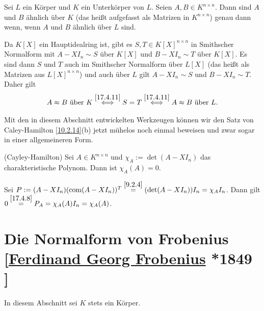 \documentclass[../../main.tex]{subfiles}
\begin{document}
\begin{pro}\label{17.4.14}
Sei $L$ ein Körper und $K$ ein Unterkörper von $L$. Seien $A,B\in K^{n\times n}$. Dann sind $A$ und $B$ ähnlich über $K$ (das heißt aufgefasst als Matrizen in $K^{n\times n}$) genau dann wenn, wenn $A$ und $B$ ähnlich über $L$ sind.
\end{pro}
\begin{cproof}
Da $K[X]$ ein Hauptidealring ist, gibt es $S,T\in K[X]^{n\times n}$ in Smithscher Normalform mit $A-XI_n\sim S$ über $K[X]$ und $B-XI_n\sim T$ über $K[X]$. Es sind dann $S$ und $T$ auch im Smithscher Normalform über $L[X]$ (das heißt als Matrizen aus $L[X]^{n\times n}$) und auch über $L$ gilt $A-XI_n\sim S$ und $B-XI_n\sim T$. Daher gilt
\begin{align*}
A\approx B\text{ über }K\stackrel{\ref{17.4.11}}{\Longleftrightarrow}S=T \stackrel{\ref{17.4.11}}{\Longleftrightarrow}A\approx B\text{ über }L.
\end{align*}
\end{cproof}

Mit den in diesem Abschnitt entwickelten Werkzeugen können wir den Satz von Caley-Hamilton \ref{10.2.14}(b) jetzt mühelos noch einmal beweisen und zwar sogar in einer allgemeineren Form.

\begin{sat}\label{17.4.15}
(Cayley-Hamilton) Sei $A\in K^{n\times n}$ und $\chi_A:=\det(A-XI_n)$ das charakteristische Polynom. Dann ist $\chi_A(A)=0$.
\end{sat}
\begin{cproof}
Sei $P:=(A-XI_n)(\operatorname{com}(A-XI_n))^T\stackrel{\ref{9.2.4}}{=}(\det(A-XI_n))I_n=\chi_AI_n$. Dann gilt $0\stackrel{\ref{17.4.8}}{=}P_A=\chi_A(A)I_n=\chi_A(A)$.
\end{cproof}

\section[Die Normalform von Frobenius]{Die Normalform von Frobenius\\{\small[\href{https://de.wikipedia.org/wiki/Ferdinand_Georg_Frobenius}{Ferdinand Georg Frobenius} *1849 }]}
In diesem Abschnitt sei $K$ stets ein Körper.
\end{document}
